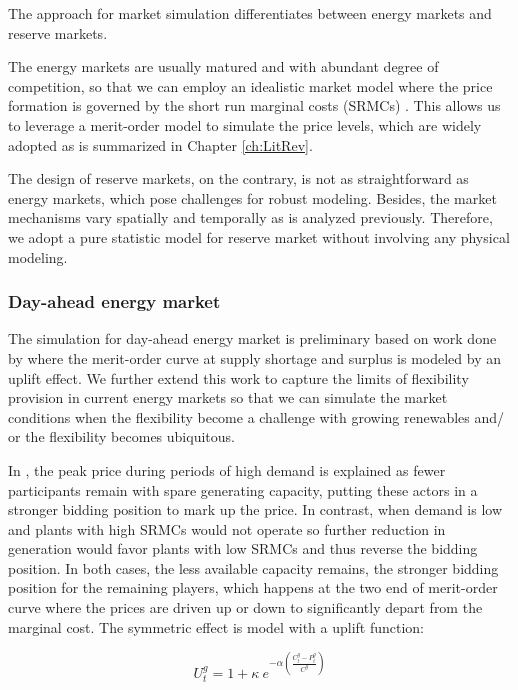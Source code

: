 The approach for market simulation differentiates between energy markets and reserve markets. 

The energy markets are usually matured and with abundant degree of competition, so that we can employ an idealistic market model where the price formation is governed by the short run marginal costs (SRMCs) \cite{Grunewald2012} \cite{Grunewald2012a}. This allows us to leverage a merit-order model to simulate the price levels, which are widely adopted as is summarized in Chapter \ref{ch:LitRev}. 

The design of reserve markets, on the contrary, is not as straightforward as energy markets, which pose challenges for robust modeling. Besides, the market mechanisms vary spatially and temporally as is analyzed previously. Therefore, we adopt a pure statistic model for reserve market without involving any physical modeling.

\subsubsection{Day-ahead energy market}

The simulation for day-ahead energy market is preliminary based on work done by \cite{Grunewald2012a} where the merit-order curve at supply shortage and surplus is modeled by an uplift effect. We further extend this work to capture the limits of flexibility provision in current energy markets so that we can simulate the market conditions when the flexibility become a challenge with growing renewables and/ or the flexibility becomes ubiquitous.

In \cite{Grunewald2012a}, the peak price during periods of high demand is explained as fewer participants remain with spare generating capacity, putting these actors in a stronger bidding position to mark up the price. In contrast, when demand is low and plants with high SRMCs would not operate so further reduction in generation would favor plants with low SRMCs and thus reverse the bidding position. In both cases, the less available capacity remains, the stronger bidding position for the remaining players, which happens at the two end of merit-order curve where the prices are driven up or down to significantly depart from the marginal cost. The symmetric effect is model with a uplift function:

\begin{equation}
U_t^g = 1 + \kappa~e^{-\alpha\left(\frac{C_t^g -P^g_t }{C^g}\right)}
\end{equation}

